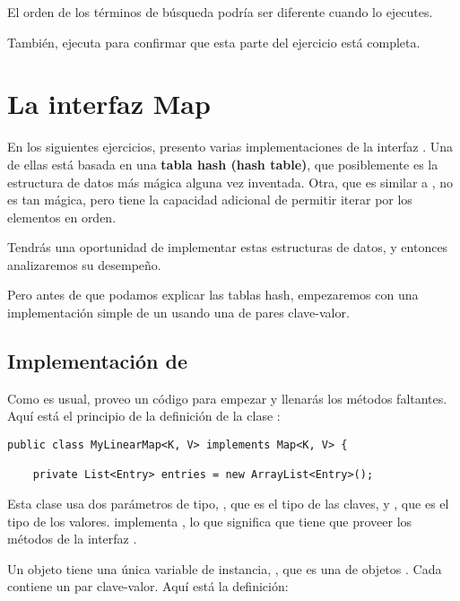 \documentclass[12pt]{book}
\theoremstyle{exercise}
\begin{document}
El orden de los términos de búsqueda podría ser diferente cuando lo ejecutes.

También, ejecuta  para confirmar que esta parte del ejercicio
está completa.


\chapter{La interfaz Map}

En los siguientes ejercicios, presento varias implementaciones de la
interfaz . Una de ellas está basada en una \textbf{tabla hash (hash table)},
que posiblemente es la estructura de datos más mágica alguna vez
inventada. Otra, que es similar a , no es tan mágica,
pero tiene la capacidad adicional de permitir iterar por los
elementos en orden.


Tendrás una oportunidad de implementar estas estructuras de datos, y entonces
analizaremos su desempeño.

Pero antes de que podamos explicar las tablas hash, empezaremos con una
implementación simple de un  usando una  de pares
clave-valor.

\section{Implementación de }
\label{implementing-mylinearmap}


Como es usual, proveo un código para empezar y llenarás los métodos
faltantes. Aquí está el principio de la definición de la clase
:

\begin{verbatim}
public class MyLinearMap<K, V> implements Map<K, V> {

    private List<Entry> entries = new ArrayList<Entry>();
\end{verbatim}

Esta clase usa dos parámetros de tipo, , que es el tipo de
las claves, y , que es el tipo de los valores.
 implementa , lo que significa que tiene que
proveer los métodos de la interfaz .


Un objeto  tiene una única variable de instancia,
, que es una  de objetos
. Cada  contiene un par clave-valor. Aquí
está la definición:
\end{document}
